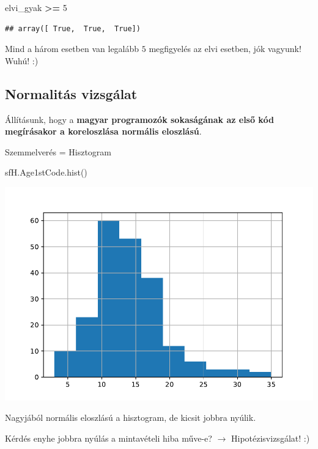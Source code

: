 \documentclass[
]{book}
\newenvironment{Shaded}{\begin{snugshade}}{\end{snugshade}}
\newcommand{\DecValTok}[1]{\textcolor[rgb]{0.00,0.00,0.81}{#1}}
\newcommand{\NormalTok}[1]{#1}
\newcommand{\OperatorTok}[1]{\textcolor[rgb]{0.81,0.36,0.00}{\textbf{#1}}}
\begin{document}
\begin{Shaded}
\begin{Highlighting}[]
\NormalTok{elvi\_gyak }\OperatorTok{\textgreater{}=} \DecValTok{5}
\end{Highlighting}
\end{Shaded}

\begin{verbatim}
## array([ True,  True,  True])
\end{verbatim}

Mind a három esetben van legalább \(5\) megfigyelés az elvi esetben, jók vagyunk! Wuhú! :)

\subsection{Normalitás vizsgálat}\label{normalituxe1s-vizsguxe1lat}

Állításunk, hogy a \textbf{magyar programozók sokaságának az első kód megírásakor a koreloszlása normális eloszlású}.

Szemmelverés = Hisztogram

\begin{Shaded}
\begin{Highlighting}[]
\NormalTok{sfH.Age1stCode.hist()}
\end{Highlighting}
\end{Shaded}

\includegraphics{_main_files/figure-latex/unnamed-chunk-371-33.pdf}

Nagyjából normális eloszlású a hisztogram, de kicsit jobbra nyúlik.

Kérdés enyhe jobbra nyúlás a mintavételi hiba műve-e? \(\rightarrow\) Hipotézisvizsgálat! :)
\end{document}
